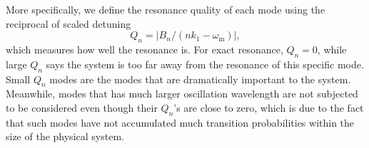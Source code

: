 \documentclass[%
reprint,
 amsmath,amssymb,
 aps,
]{revtex4-1}
\begin{document}

More specifically, we define the resonance quality of each mode using the reciprocal of scaled detuning 
　\begin{equation}
　Q_n = \lvert B_n/( n k_1 - \omega_{\mathrm{m}}  )\rvert,
　\end{equation}
which measures how well the resonance is. For exact resonance, $Q_n=0$, while large $Q_n$ says the system is too far away from the resonance of this specific mode. Small $Q_n$ modes are the modes that are dramatically important to the system. Meanwhile, modes that has much larger oscillation wavelength are not subjected to be considered even though their $Q_n$'s are close to zero, which is due to the fact that such modes have not accumulated much transition probabilities within the size of the physical system.




\end{document}
